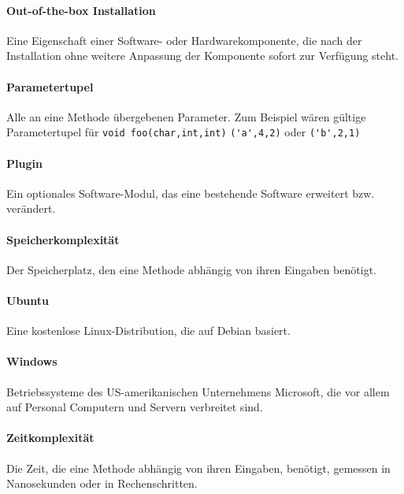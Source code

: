 \documentclass[a4paper]{report}
\begin{document}
\paragraph{Out-of-the-box Installation} Eine Eigenschaft einer Software- oder Hardwarekomponente, die nach der Installation ohne weitere Anpassung der Komponente sofort zur Verfügung steht.

\paragraph{Parametertupel} Alle an eine Methode übergebenen Parameter. Zum Beispiel wären gültige Parametertupel für \verb|void foo(char,int,int)| \verb|('a',4,2)| oder \verb|('b',2,1)|

\paragraph{Plugin} Ein optionales Software-Modul, das eine bestehende Software erweitert bzw. verändert.

\paragraph{Speicherkomplexität} Der Speicherplatz, den eine Methode abhängig von ihren Eingaben benötigt.

\paragraph{Ubuntu} Eine kostenlose Linux-Distribution, die auf Debian basiert.

\paragraph{Windows} Betriebssysteme des US-amerikanischen Unternehmens Microsoft, die vor allem auf Personal Computern und Servern verbreitet sind.

\paragraph{Zeitkomplexität} Die Zeit, die eine Methode abhängig von ihren Eingaben, benötigt, gemessen in Nanosekunden oder in Rechenschritten.
\end{document}
